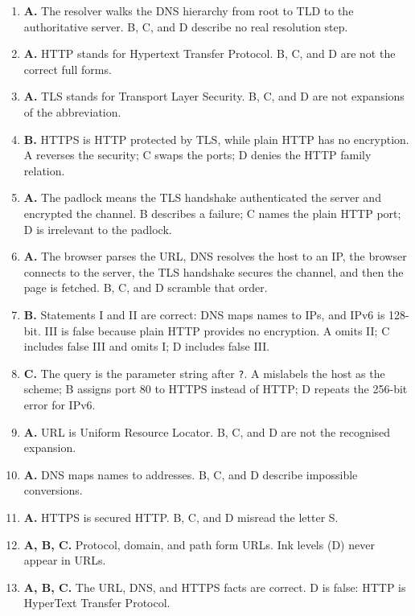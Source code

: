 \documentclass[11pt]{article}
\begin{document}
\begin{enumerate}[label=\textbf{Q\arabic*.}, leftmargin=*]
  under HTTPS. Mapping names (A), hierarchy (B), and caching (C) are all
  true of DNS.
\item \textbf{A.} The resolver walks the DNS hierarchy from root to TLD to
  the authoritative server. B, C, and D describe no real resolution step.
\item \textbf{A.} HTTP stands for Hypertext Transfer Protocol. B, C, and D
  are not the correct full forms.
\item \textbf{A.} TLS stands for Transport Layer Security. B, C, and D are
  not expansions of the abbreviation.
\item \textbf{B.} HTTPS is HTTP protected by TLS, while plain HTTP has no
  encryption. A reverses the security; C swaps the ports; D denies the
  HTTP family relation.
\item \textbf{A.} The padlock means the TLS handshake authenticated the
  server and encrypted the channel. B describes a failure; C names the plain
  HTTP port; D is irrelevant to the padlock.
\item \textbf{A.} The browser parses the URL, DNS resolves the host to an
  IP, the browser connects to the server, the TLS handshake secures the
  channel, and then the page is fetched. B, C, and D scramble that order.
\item \textbf{B.} Statements I and II are correct: DNS maps names to IPs,
  and IPv6 is 128-bit. III is false because plain HTTP provides no
  encryption. A omits II; C includes false III and omits I; D includes false
  III.
\item \textbf{C.} The query is the parameter string after \texttt{?}. A
  mislabels the host as the scheme; B assigns port 80 to HTTPS instead of
  HTTP; D repeats the 256-bit error for IPv6.

\item \textbf{A.} URL is Uniform Resource Locator. B, C, and D are not the recognised expansion.
\item \textbf{A.} DNS maps names to addresses. B, C, and D describe impossible conversions.
\item \textbf{A.} HTTPS is secured HTTP. B, C, and D misread the letter S.
\item \textbf{A, B, C.} Protocol, domain, and path form URLs. Ink levels (D) never appear in URLs.
\item \textbf{A, B, C.} The URL, DNS, and HTTPS facts are correct. D is false: HTTP is HyperText Transfer Protocol.
\end{enumerate}
\def\JKSSBLessonID{35}\def\JKSSBAnswers{1}
\end{document}

